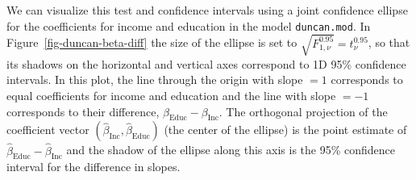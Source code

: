 \documentclass[
  letterpaper,
  10pt,
  krantz2]{krantz}
\begin{document}
We can visualize this test and confidence intervals using a joint
confidence ellipse for the coefficients for income and education in the
model \texttt{duncan.mod}. In Figure~\ref{fig-duncan-beta-diff} the size
of the ellipse is set to \(\sqrt{F^{0.95}_{1,\nu}} = t^{0.95}_{\nu}\),
so that its shadows on the horizontal and vertical axes correspond to 1D
95\% confidence intervals. In this plot, the line through the origin
with slope \(= 1\) corresponds to equal coefficients for income and
education and the line with slope \(= -1\) corresponds to their
difference, \(\beta_{\text{Educ}} - \beta_{\text{Inc}}\). The orthogonal
projection of the coefficient vector
\((\widehat{\beta}_{\text{Inc}}, \widehat{\beta}_{\text{Educ}})\) (the
center of the ellipse) is the point estimate of
\(\widehat{\beta}_{\text{Educ}} - \widehat{\beta}_{\text{Inc}}\) and the
shadow of the ellipse along this axis is the 95\% confidence interval
for the difference in slopes.
\end{document}
